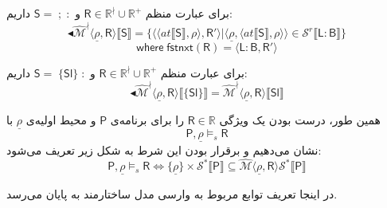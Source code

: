 برای عبارت منظم 
$\mathsf{R} \in \mathbb{R}^\nmid \cup \mathbb{R^+}$
و 
$\mathsf{S= \; ; \;:}$
داریم:
$$\blacktriangleleft\mathcal{\hat{M}^\nmid}  \langle \underline{\rho}, \mathsf{R} \rangle \llbracket \mathsf{S} \rrbracket = \{\langle \langle at \llbracket \mathsf{S} \rrbracket , \rho \rangle , \mathsf{R'} \rangle | \langle \underline{\rho}, \langle at \llbracket \mathsf{S} \rrbracket , \rho \rangle \rangle \in \mathcal{S}^r \llbracket \mathsf{L:B}\rrbracket\}$$
$$\mathsf{where \; fstnxt (R) = \langle L:B,R' \rangle}$$
	
	

برای عبارت منظم 
$\mathsf{R} \in \mathbb{R}^\nmid \cup \mathbb{R^+}$
و 
$\mathsf{S= \; \{Sl\} \;:}$
داریم:
$$\blacktriangleleft \mathcal{\hat{M}^\nmid} \langle \underline{\rho}, \mathsf{R} \rangle \llbracket \{\mathsf{Sl}\} \rrbracket =
 \mathcal{\hat{M}^\nmid} \langle \underline{\rho}, \mathsf{R} \rangle \llbracket \mathsf{Sl} \rrbracket$$


همین طور، درست بودن یک ویژگی $\mathsf{R} \in \mathbb{R}$ را برای برنامه‌ی $\mathsf{P}$ و محیط اولیه‌ی $\underline{\rho}$ با 
$$\mathsf{P} , \underline{\rho} \models_s \mathsf{R}$$
نشان می‌دهیم و برقرار بودن این شرط به شکل زیر تعریف می‌شود:
$$\mathsf{P} , \underline{\rho} \models_s \mathsf{R} \iff \{\underline{\rho}\} \times \mathcal{S}^* \llbracket \mathsf{P} \rrbracket \subseteq \hat{\mathcal{M}} \langle \underline{\rho} , \mathsf{R} \rangle \mathcal{S}^* \llbracket \mathsf{P} \rrbracket$$

در اینجا تعریف توابع مربوط به وارسی مدل ساختارمند به پایان می‌رسد.

 
 
 
 
 